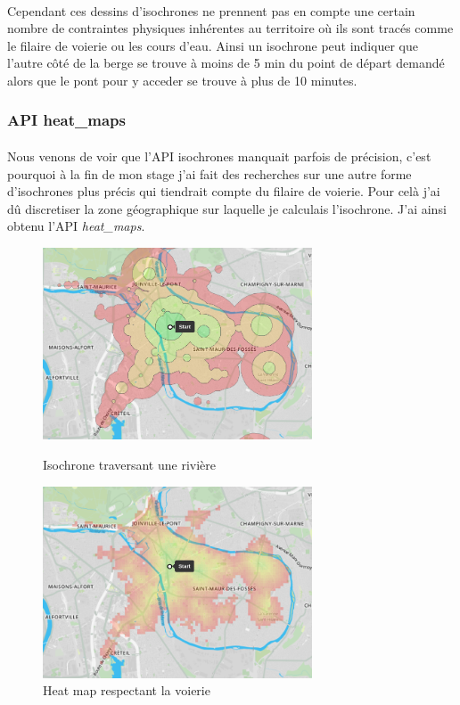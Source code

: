 \documentclass[a4paper]{report}
\begin{document}
\paragraph{} Cependant ces dessins d'isochrones ne prennent pas en compte une certain nombre de contraintes physiques inhérentes au territoire où ils sont tracés comme le filaire de voierie ou les cours d'eau. Ainsi un isochrone peut indiquer que l'autre côté de la berge se trouve à moins de 5 min du point de départ demandé alors que le pont pour y acceder se trouve à plus de 10 minutes.

\subsubsection{API heat\_maps} 

\paragraph{} Nous venons de voir que l'API isochrones manquait parfois de précision, c'est pourquoi à la fin de mon stage j'ai fait des recherches sur une autre forme d'isochrones plus précis qui tiendrait compte du filaire de voierie. Pour celà j'ai dû discretiser la zone géographique sur laquelle je calculais l'isochrone. J'ai ainsi obtenu l'API \emph{heat\_maps}.

\begin{figure}[H]
	\begin{minipage}[c]{.46\linewidth}
		\includegraphics[width=8cm]{image/comp_iso_fin}
       		\caption{Isochrone traversant une rivière}
		\label{Isochrone traversant une rivière}
	\end{minipage} \hfill
	\begin{minipage}[c]{.46\linewidth}
		\includegraphics[width=8cm]{image/comp_raster_fin}
       		\caption{Heat map respectant la voierie}
		\label{Heat map respectant la voierie}
	\end{minipage}
\end{figure}
\end{document}
